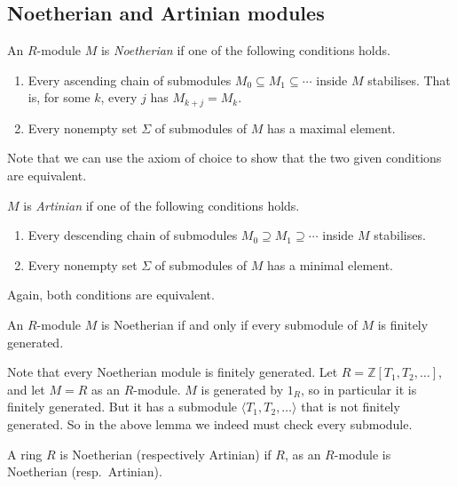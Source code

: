 \subsection{Noetherian and Artinian modules}
\begin{definition}
    An \( R \)-module \( M \) is \emph{Noetherian} if one of the following conditions holds.
    \begin{enumerate}
        \item Every ascending chain of submodules \( M_0 \subseteq M_1 \subseteq \cdots \) inside \( M \) stabilises.
        That is, for some \( k \), every \( j \) has \( M_{k+j} = M_k \).
        \item Every nonempty set \( \Sigma \) of submodules of \( M \) has a maximal element.
    \end{enumerate}
\end{definition}
Note that we can use the axiom of choice to show that the two given conditions are equivalent.
\begin{definition}
    \( M \) is \emph{Artinian} if one of the following conditions holds.
    \begin{enumerate}
        \item Every descending chain of submodules \( M_0 \supseteq M_1 \supseteq \cdots \) inside \( M \) stabilises.
        \item Every nonempty set \( \Sigma \) of submodules of \( M \) has a minimal element.
    \end{enumerate}
\end{definition}
Again, both conditions are equivalent.
\begin{lemma}
    An \( R \)-module \( M \) is Noetherian if and only if every submodule of \( M \) is finitely generated.
\end{lemma}
Note that every Noetherian module is finitely generated.
Let \( R = \mathbb Z[T_1, T_2, \dots] \), and let \( M = R \) as an \( R \)-module.
\( M \) is generated by \( 1_R \), so in particular it is finitely generated.
But it has a submodule \( \langle T_1, T_2, \dots \rangle \) that is not finitely generated.
So in the above lemma we indeed must check every submodule.
\begin{definition}
    A ring \( R \) is Noetherian (respectively Artinian) if \( R \), as an \( R \)-module is Noetherian (resp.\ Artinian).
\end{definition}

